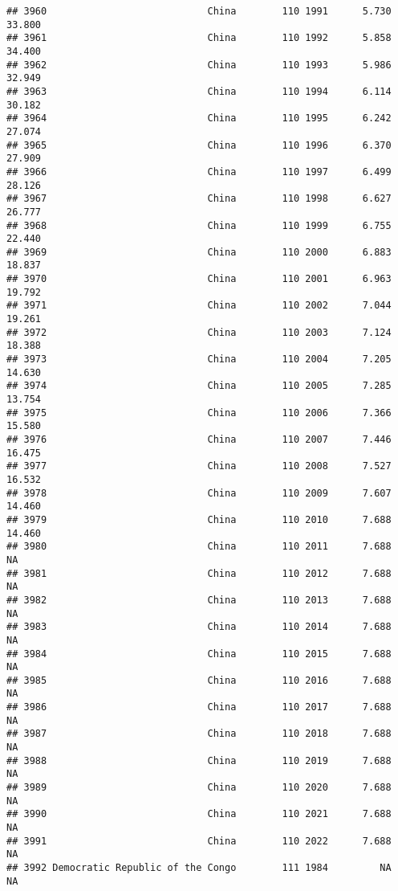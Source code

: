 \documentclass[
]{article}
\begin{document}
\begin{verbatim}
## 3960                            China        110 1991      5.730     33.800
## 3961                            China        110 1992      5.858     34.400
## 3962                            China        110 1993      5.986     32.949
## 3963                            China        110 1994      6.114     30.182
## 3964                            China        110 1995      6.242     27.074
## 3965                            China        110 1996      6.370     27.909
## 3966                            China        110 1997      6.499     28.126
## 3967                            China        110 1998      6.627     26.777
## 3968                            China        110 1999      6.755     22.440
## 3969                            China        110 2000      6.883     18.837
## 3970                            China        110 2001      6.963     19.792
## 3971                            China        110 2002      7.044     19.261
## 3972                            China        110 2003      7.124     18.388
## 3973                            China        110 2004      7.205     14.630
## 3974                            China        110 2005      7.285     13.754
## 3975                            China        110 2006      7.366     15.580
## 3976                            China        110 2007      7.446     16.475
## 3977                            China        110 2008      7.527     16.532
## 3978                            China        110 2009      7.607     14.460
## 3979                            China        110 2010      7.688     14.460
## 3980                            China        110 2011      7.688         NA
## 3981                            China        110 2012      7.688         NA
## 3982                            China        110 2013      7.688         NA
## 3983                            China        110 2014      7.688         NA
## 3984                            China        110 2015      7.688         NA
## 3985                            China        110 2016      7.688         NA
## 3986                            China        110 2017      7.688         NA
## 3987                            China        110 2018      7.688         NA
## 3988                            China        110 2019      7.688         NA
## 3989                            China        110 2020      7.688         NA
## 3990                            China        110 2021      7.688         NA
## 3991                            China        110 2022      7.688         NA
## 3992 Democratic Republic of the Congo        111 1984         NA         NA

\end{verbatim}
\end{document}
